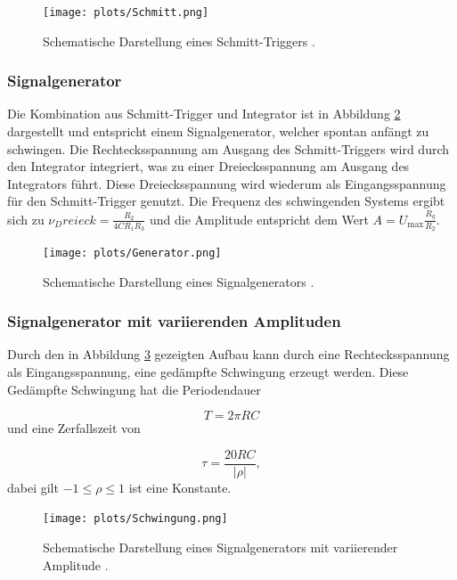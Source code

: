 \begin{figure}
    \centering
        \texttt{[image: plots/Schmitt.png]}
    \caption{Schematische Darstellung eines Schmitt-Triggers \cite{Anleitung}.}
    \label{fig:5}
\end{figure}

\subsubsection{Signalgenerator}
\label{sec:Signalgenerator}

Die Kombination aus Schmitt-Trigger und Integrator ist in Abbildung \ref{fig:6} dargestellt und entspricht einem Signalgenerator, welcher spontan anfängt zu schwingen.
Die Rechtecksspannung am Ausgang des Schmitt-Triggers wird durch den Integrator integriert, was zu einer Dreiecksspannung am Ausgang des Integrators führt.
Diese Dreiecksspannung wird wiederum als Eingangsspannung für den Schmitt-Trigger genutzt.
Die Frequenz des schwingenden Systems ergibt sich zu $\nu_Dreieck = \frac{R_2}{4 C R_1 R_3}$ und die Amplitude entspricht dem Wert $A = U_{\text{max}} \frac{R_q}{R_2}$.

\begin{figure}
    \centering
        \texttt{[image: plots/Generator.png]}
    \caption{Schematische Darstellung eines Signalgenerators \cite{Anleitung}.}
    \label{fig:6}
\end{figure}


\subsubsection{Signalgenerator mit variierenden Amplituden}
\label{sec:Signalgenerator_2}

Durch den in Abbildung \ref{fig:7} gezeigten Aufbau kann durch eine Rechtecksspannung als Eingangsspannung, eine gedämpfte Schwingung erzeugt werden.
Diese Gedämpfte Schwingung hat die Periodendauer 

\begin{equation}
    T = 2 \pi R C
\end{equation}
und eine Zerfallszeit von

\begin{equation}
    \tau = \frac{20 R C}{|\rho|},
\end{equation}
dabei gilt $-1 \leq \rho \leq 1$ ist eine Konstante.

\begin{figure}
    \centering
        \texttt{[image: plots/Schwingung.png]}
    \caption{Schematische Darstellung eines Signalgenerators mit variierender Amplitude \cite{Anleitung}.}
    \label{fig:7}
\end{figure}